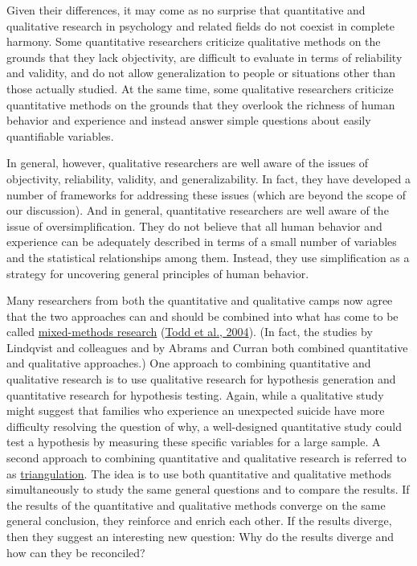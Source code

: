 \documentclass[
]{krantz}
\begin{document}
Given their differences, it may come as no surprise that quantitative and qualitative research in psychology and related fields do not coexist in complete harmony. Some quantitative researchers criticize qualitative methods on the grounds that they lack objectivity, are difficult to evaluate in terms of reliability and validity, and do not allow generalization to people or situations other than those actually studied. At the same time, some qualitative researchers criticize quantitative methods on the grounds that they overlook the richness of human behavior and experience and instead answer simple questions about easily quantifiable variables.

In general, however, qualitative researchers are well aware of the issues of objectivity, reliability, validity, and generalizability. In fact, they have developed a number of frameworks for addressing these issues (which are beyond the scope of our discussion). And in general, quantitative researchers are well aware of the issue of oversimplification. They do not believe that all human behavior and experience can be adequately described in terms of a small number of variables and the statistical relationships among them. Instead, they use simplification as a strategy for uncovering general principles of human behavior.

Many researchers from both the quantitative and qualitative camps now agree that the two approaches can and should be combined into what has come to be called \protect\hyperlink{mixed-methods-research}{mixed-methods research} (\protect\hyperlink{ref-todd2004mixing}{Todd et al., 2004}). (In fact, the studies by Lindqvist and colleagues and by Abrams and Curran both combined quantitative and qualitative approaches.) One approach to combining quantitative and qualitative research is to use qualitative research for hypothesis generation and quantitative research for hypothesis testing. Again, while a qualitative study might suggest that families who experience an unexpected suicide have more difficulty resolving the question of why, a well-designed quantitative study could test a hypothesis by measuring these specific variables for a large sample. A second approach to combining quantitative and qualitative research is referred to as \protect\hyperlink{triangulation}{triangulation}. The idea is to use both quantitative and qualitative methods simultaneously to study the same general questions and to compare the results. If the results of the quantitative and qualitative methods converge on the same general conclusion, they reinforce and enrich each other. If the results diverge, then they suggest an interesting new question: Why do the results diverge and how can they be reconciled?
\end{document}
